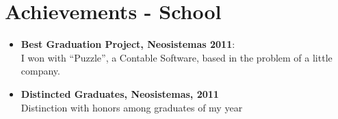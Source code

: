 \documentclass[a4paper,11pt]{article} %
\begin{document}
\section{Achievements - School}
\begin{itemize}
\item \textbf{Best Graduation Project, Neosistemas 2011}:\\
I won with ``Puzzle'', a Contable Software, based in the problem of a little company.
\item \textbf{Distincted Graduates, Neosistemas, 2011}\\
Distinction with honors among graduates of my year
\end{itemize}
\end{document}
